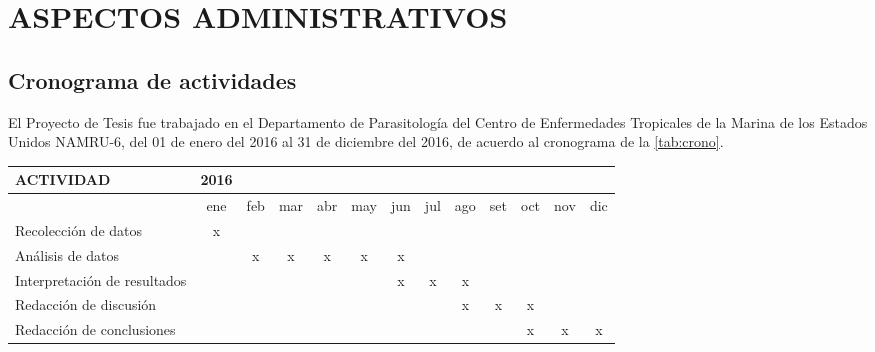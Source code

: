 \documentclass[a4paper]{article}
\begin{document}
\section{ASPECTOS ADMINISTRATIVOS}\label{aspectos-administrativos}

\subsection{Cronograma de actividades}\label{cronograma-de-actividades}

El Proyecto de Tesis fue trabajado en el Departamento de Parasitología
del Centro de Enfermedades Tropicales de la Marina de los Estados Unidos
NAMRU-6, del 01 de enero del 2016 al 31 de diciembre del 2016, de
acuerdo al cronograma de la \autoref{tab:crono}.

\begin{table}[ht]
        \label{tab:crono}
        \vspace{3mm}
\begin{center}
\begin{tabular}{lcccccccccccc}
  \hline
  \textbf{ACTIVIDAD} & 
  \textbf{2016} & & & & & & & & & & &\\
  \hline
  & 
  ene & feb & mar & abr & may & jun & jul & ago & set & oct & nov & dic\\
  \cline{2-13}
  Recolección de datos & 
  x & & & & & & & & & & &\\
  \cline{2-13}
  Análisis de datos & 
  & x & x & x & x & x & & & & & &\\
  \cline{2-13}
  Interpretación de resultados & 
  & & & & & x & x & x & & & &\\
  \cline{2-13}
  Redacción de discusión & 
  & & & & & & & x & x & x & &\\
  \cline{2-13}
  Redacción de conclusiones & 
  & & & & & & & & & x & x & x\\
  \hline
\end{tabular}
\end{center}
\end{table}
\end{document}
